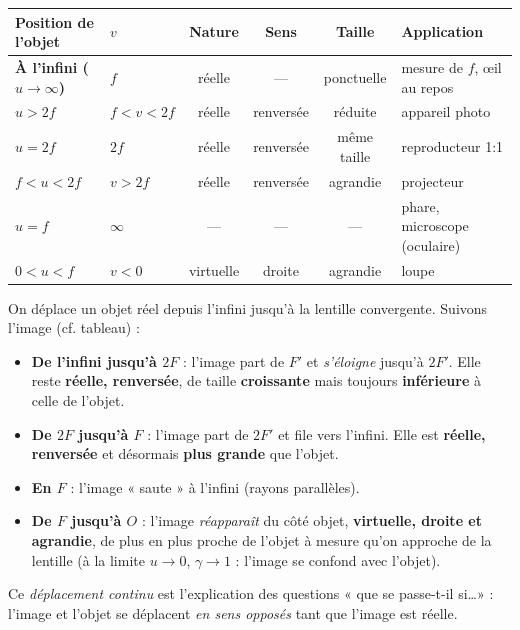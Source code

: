 \documentclass[11pt,a4paper]{article}
\newcommand{\gamm}{\gamma}             %
\begin{document}
\begin{center}
\small
\renewcommand{\arraystretch}{1.3}
\setlength{\tabcolsep}{5pt}
\begin{tabular}{>{\bfseries}p{3.0cm}>{\centering\arraybackslash}p{1.5cm}cccp{2.7cm}}
\rowcolor{primary!18}
Position de l'objet & $v$ & Nature & Sens & Taille & Application \\
\midrule
À l'infini ($u\to\infty$) & $f$ & réelle & --- & ponctuelle & mesure de $f$, œil au repos \\
$u>2f$ & $f<v<2f$ & réelle & renversée & réduite & appareil photo \\
$u=2f$ & $2f$ & réelle & renversée & même taille & reproducteur 1:1 \\
$f<u<2f$ & $v>2f$ & réelle & renversée & agrandie & projecteur \\
$u=f$ & $\infty$ & --- & --- & --- & phare, microscope (oculaire) \\
$0<u<f$ & $v<0$ & virtuelle & droite & agrandie & loupe \\
\bottomrule
\end{tabular}
\end{center}

\begin{exemple}
On déplace un objet réel depuis l'infini jusqu'à la lentille convergente. Suivons l'image (cf.
tableau) :
\begin{itemize}[leftmargin=1.7em,topsep=2pt,itemsep=1pt]
  \item \textbf{De l'infini jusqu'à $2F$} : l'image part de $F'$ et \emph{s'éloigne} jusqu'à $2F'$.
        Elle reste \textbf{réelle, renversée}, de taille \textbf{croissante} mais toujours
        \textbf{inférieure} à celle de l'objet.
  \item \textbf{De $2F$ jusqu'à $F$} : l'image part de $2F'$ et file vers l'infini. Elle est
        \textbf{réelle, renversée} et désormais \textbf{plus grande} que l'objet.
  \item \textbf{En $F$} : l'image « saute » à l'infini (rayons parallèles).
  \item \textbf{De $F$ jusqu'à $O$} : l'image \emph{réapparaît} du côté objet, \textbf{virtuelle,
        droite et agrandie}, de plus en plus proche de l'objet à mesure qu'on approche de la lentille
        (à la limite $u\to 0$, $\gamm\to 1$ : l'image se confond avec l'objet).
\end{itemize}
Ce \emph{déplacement continu} est l'explication des questions « que se passe-t-il si\ldots » :
l'image et l'objet se déplacent \emph{en sens opposés} tant que l'image est réelle.
\end{exemple}
\end{document}
